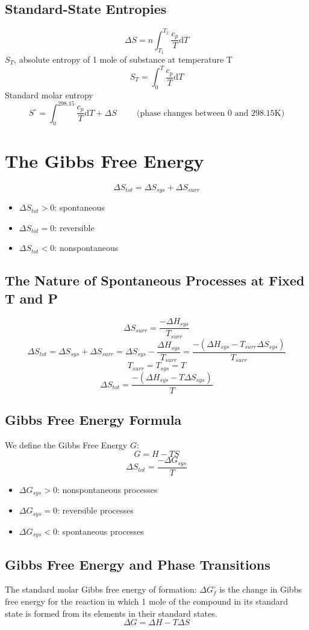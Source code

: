 \documentclass[10pt]{article}
\newcommand{\der}{\text{d}}
\begin{document}
\subsection*{Standard-State Entropies}
\[\Delta S = n \int_{T_1}^{T_2} \frac{c_p}{T}\der T\]
$S_T$, absolute entropy of 1 mole of substance at temperature T
\[S_T = \int_0^T \frac{c_p}{T}\der T\]
Standard molar entropy
\[S^\circ = \int_0^{298.15} \frac{c_p}{T}\der T + \Delta S \hspace{1cm}\text{(phase changes between 0 and 298.15K)}\]

\section*{The Gibbs Free Energy}
\[\Delta S_{tot} = \Delta S_{sys} + \Delta S_{surr}\]
\begin{itemize}
    \item $\Delta S_{tot} > 0$: spontaneous
    \item $\Delta S_{tot} = 0$: reversible
    \item $\Delta S_{tot} < 0$: nonspontaneous
\end{itemize}

\subsection*{The Nature of Spontaneous Processes at Fixed T and P}
\[\Delta S_{surr} = \frac{- \Delta H_{sys}}{T_{surr}}\]
\[\Delta S_{tot} = \Delta S_{sys} + \Delta S_{surr} = \Delta S_{sys} - \frac{\Delta H_{sys}}{T_{surr}} = \frac{-(\Delta H_{sys} - T_{surr}\Delta S_{sys})}{T_{surr}}\]
\[T_{surr} = T_{sys} = T\]
\[\Delta S_{tot} = \frac{-(\Delta H_{sys} - T\Delta S_{sys})}{T}\]

\subsection*{Gibbs Free Energy Formula}
We define the Gibbs Free Energy $G$:
\[G = H - TS\]
\[\Delta S_{tot} = \frac{-\Delta G_{sys}}{T}\]
\begin{itemize}
    \item $\Delta G_{sys} > 0$: nonspontaneous processes
    \item $\Delta G_{sys} = 0$: reversible processes
    \item $\Delta G_{sys} < 0$: spontaneous processes
\end{itemize}

\subsection*{Gibbs Free Energy and Phase Transitions}
The standard molar Gibbs free energy of formation: $\Delta G_f^\circ$ is the change in Gibbs free energy for the reaction in which 1 mole of the compound in its standard state is formed from its elements in their standard states.
\[\Delta G = \Delta H - T\Delta S\]
\end{document}
